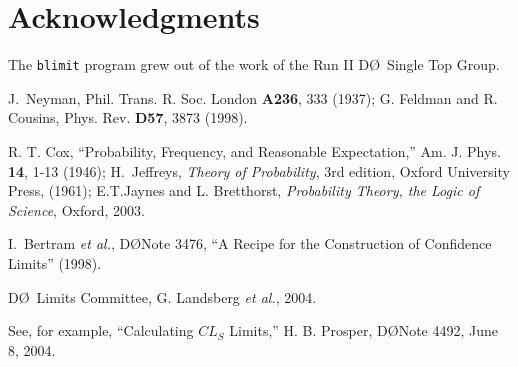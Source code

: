 \documentclass[preprint,eqsecnum,aps]{revtex4}
\begin{document}

\section*{Acknowledgments}
The {\tt blimit} program grew out of the work of the
Run II D\O\ Single Top Group.

\begin{thebibliography}{}

 J.~Neyman, Phil. Trans. R. Soc. London {\bf A236}, 333
(1937); G. Feldman and R. Cousins, Phys. Rev. {\bf D57},
  3873 (1998).

 R. T.
Cox, ``Probability, Frequency, and Reasonable Expectation,'' Am.
J. Phys. {\bf 14}, 1-13 (1946); H.~Jeffreys, \emph{Theory of
Probability}, 3rd edition, Oxford University Press, (1961);
E.T.Jaynes and L. Bretthorst, \emph{Probability Theory, the Logic
of Science}, Oxford, 2003.

I.~Bertram {\em et al.}, D\O Note 3476, ``A Recipe for the
Construction of Confidence Limits'' (1998).

D\O\ Limits Committee, G. Landsberg {\em et al.}, 2004.

See, for example, ``Calculating $CL_S$ Limits,'' 
H. B. Prosper, D\O Note 4492, June 8, 2004.

\end{thebibliography}
\end{document}

